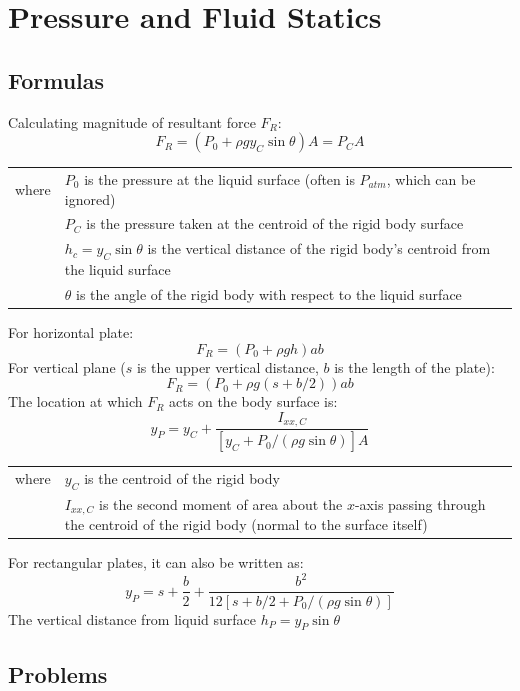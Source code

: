 \chapter{Pressure and Fluid Statics}%
\section{Formulas}
	Calculating magnitude of resultant force $ F_R $:
	\[F_R = (P_0+\rho g y_C\sin\theta)A=P_CA\]
	\begin{tabular}{lp{\linewidth-1.5cm}}
		where & $ P_0 $ is the pressure at the liquid surface (often is $ P_{atm} $, which can be ignored)\\
		&$ P_C $ is the pressure taken at the centroid of the rigid body surface\\
		& $ h_c =y_C\sin\theta$ is the vertical distance of the rigid body's centroid from the liquid surface\\
		& $ \theta $ is the angle of the rigid body with respect to the liquid surface
	\end{tabular}
	For horizontal plate:
	\[F_R = (P_0+\rho g h)ab\]
	For vertical plane ($ s $ is the upper vertical distance, $ b $ is the length of the plate):
	\[F_R = (P_0+\rho g (s+b/2))ab\]
	The location at which $ F_R $ acts on the body surface is:
	\[y_P=y_C+\dfrac{I_{xx,C}}{[y_C+P_0/(\rho g\sin\theta)]A}\]
	 \begin{tabular}{lp{\linewidth-1.5cm}}
	 	where & $ y_C $ is the centroid of the rigid body\\
	 	& $ I_{xx,C}  $ is the second moment of area about the $ x $-axis passing through the centroid of the rigid body (normal to the surface itself)
	 \end{tabular}
	 For rectangular plates, it can also be written as:
	 \[y_P = s+\dfrac{b}{2}+\dfrac{b^2}{12[s+b/2+P_0/(\rho g \sin\theta)]}\]
	  The vertical distance from liquid surface $ h_P = y_P\sin\theta$
\section{Problems}
